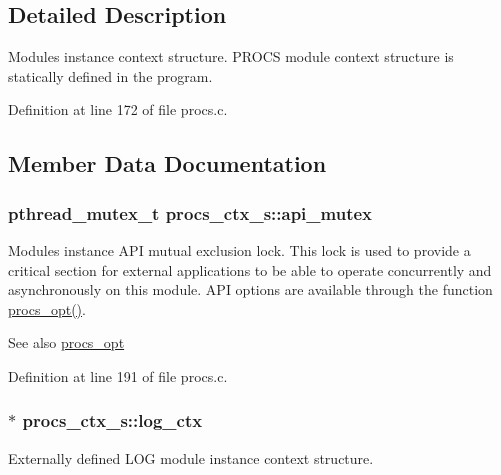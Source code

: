 \subsection{Detailed Description}
Module\textquotesingle{}s instance context structure. P\+R\+O\+CS module context structure is statically defined in the program. 

Definition at line 172 of file procs.\+c.



\subsection{Member Data Documentation}
\subsubsection[{\texorpdfstring{api\+\_\+mutex}{api_mutex}}]{\setlength{\rightskip}{0pt plus 5cm}pthread\+\_\+mutex\+\_\+t procs\+\_\+ctx\+\_\+s\+::api\+\_\+mutex}\hypertarget{structprocs__ctx__s_a27330c986436226abfa1b5a00b7bdeb1}{}\label{structprocs__ctx__s_a27330c986436226abfa1b5a00b7bdeb1}
Module\textquotesingle{}s instance A\+PI mutual exclusion lock. This lock is used to provide a critical section for external applications to be able to operate concurrently and asynchronously on this module. A\+PI options are available through the function \hyperlink{procs_8c_a7af2e6f2788006cfc96ca8d811922ffa}{procs\+\_\+opt()}. \begin{DoxySeeAlso}{See also}
\hyperlink{procs_8h_a7af2e6f2788006cfc96ca8d811922ffa}{procs\+\_\+opt} 
\end{DoxySeeAlso}


Definition at line 191 of file procs.\+c.

\subsubsection[{\texorpdfstring{log\+\_\+ctx}{log_ctx}}]{$\ast$ procs\+\_\+ctx\+\_\+s\+::log\+\_\+ctx}\hypertarget{structprocs__ctx__s_ab5d529e82924052baf26478afca901fa}{}\label{structprocs__ctx__s_ab5d529e82924052baf26478afca901fa}
Externally defined L\+OG module instance context structure. 

